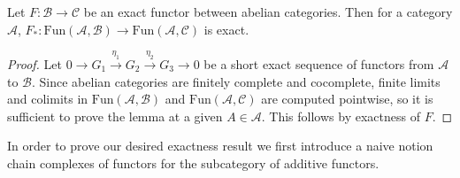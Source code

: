 \begin{lem}[label=pushForward]
    Let $F:\mathcal{B}\rightarrow \mathcal{C}$ be an exact functor between abelian categories. Then for a category $\mathcal{A}$, $F_*:\text{Fun}(\mathcal{A},\mathcal{B})\rightarrow \text{Fun}(\mathcal{A},\mathcal{C})$ is exact.
\end{lem}
\begin{proof}
    Let $0\rightarrow G_1\xrightarrow{\eta_1} G_2\xrightarrow{\eta_2} G_3\rightarrow 0$ be a short exact sequence of functors from $\mathcal{A}$ to $\mathcal{B}$. Since abelian categories are finitely complete and cocomplete, finite limits and colimits in $\text{Fun}(\mathcal{A},\mathcal{B})$ and $\text{Fun}(\mathcal{A},\mathcal{C})$ are computed pointwise, so it is sufficient to prove the lemma at a given $A \in \mathcal{A}$. This follows by exactness of $F$.
\end{proof}

In order to prove our desired exactness result we first introduce a naive notion chain complexes of functors for the subcategory of additive functors.

